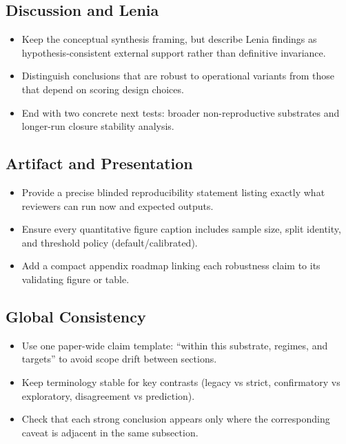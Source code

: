\documentclass[11pt]{article}
\begin{document}
\subsection*{Discussion and Lenia}
\begin{itemize}
  \item Keep the conceptual synthesis framing, but describe Lenia findings as hypothesis-consistent external support rather than definitive invariance.
  \item Distinguish conclusions that are robust to operational variants from those that depend on scoring design choices.
  \item End with two concrete next tests: broader non-reproductive substrates and longer-run closure stability analysis.
\end{itemize}

\subsection*{Artifact and Presentation}
\begin{itemize}
  \item Provide a precise blinded reproducibility statement listing exactly what reviewers can run now and expected outputs.
  \item Ensure every quantitative figure caption includes sample size, split identity, and threshold policy (default/calibrated).
  \item Add a compact appendix roadmap linking each robustness claim to its validating figure or table.
\end{itemize}

\subsection*{Global Consistency}
\begin{itemize}
  \item Use one paper-wide claim template: ``within this substrate, regimes, and targets'' to avoid scope drift between sections.
  \item Keep terminology stable for key contrasts (legacy vs strict, confirmatory vs exploratory, disagreement vs prediction).
  \item Check that each strong conclusion appears only where the corresponding caveat is adjacent in the same subsection.
\end{itemize}
\end{document}
